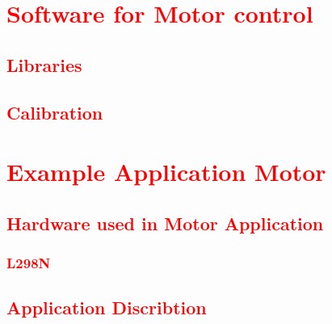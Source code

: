 \section{\textcolor{red}{Software for Motor control}}
\subsection{\textcolor{red}{Libraries}}
\subsection{\textcolor{red}{Calibration}}

\section{\textcolor{red}{Example Application Motor}}
\subsection{\textcolor{red}{Hardware used in Motor Application}}
\subsubsection{\textcolor{red}{L298N}}
\subsection{\textcolor{red}{Application Discribtion}}

